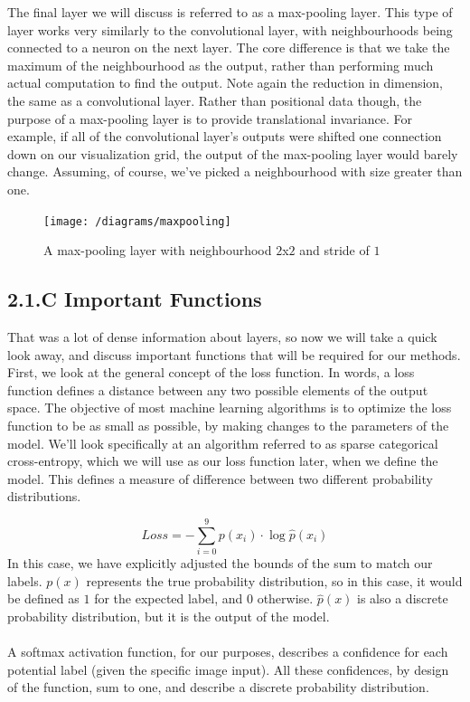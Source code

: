 \documentclass{article}
\begin{document}
The final layer we will discuss is referred to as a max-pooling layer. This type of layer works very similarly to the convolutional layer, with neighbourhoods being connected to a neuron on the next layer. The core difference is that we take the maximum of the neighbourhood as the output, rather than performing much actual computation to find the output. Note again the reduction in dimension, the same as a convolutional layer. Rather than positional data though, the purpose of a max-pooling layer is to provide translational invariance. For example, if all of the convolutional layer’s outputs were shifted one connection down on our visualization grid, the output of the max-pooling layer would barely change. Assuming, of course, we’ve picked a neighbourhood with size greater than one.\\
\begin{figure}[H]
\texttt{[image: /diagrams/maxpooling]}
\caption{A max-pooling layer with neighbourhood $2$x$2$ and stride of $1$}
\end{figure}

\subsection*{2.1.C Important Functions}
That was a lot of dense information about layers, so now we will take a quick look away, and discuss important functions that will be required for our methods. First, we look at the general concept of the loss function. In words, a loss function defines a distance between any two possible elements of the output space. The objective of most machine learning algorithms is to optimize the loss function to be as small as possible, by making changes to the parameters of the model. We’ll look specifically at an algorithm referred to as sparse categorical cross-entropy, which we will use as our loss function later, when we define the model. This defines a measure of difference between two different probability distributions.

\[Loss = -\sum_{i=0}^{9}p(x_i)\cdot \log \hat p(x_i) \]
In this case, we have explicitly adjusted the bounds of the sum to match our labels. $p(x)$ represents the true probability distribution, so in this case, it would be defined as  $1$ for the expected label, and $0$ otherwise. $\hat p(x)$ is also a discrete probability distribution, but it is the output of the model.\\\\

A softmax activation function, for our purposes, describes a confidence for each potential label (given the specific image input). All these confidences, by design of the function, sum to one, and describe a discrete probability distribution.
\end{document}
